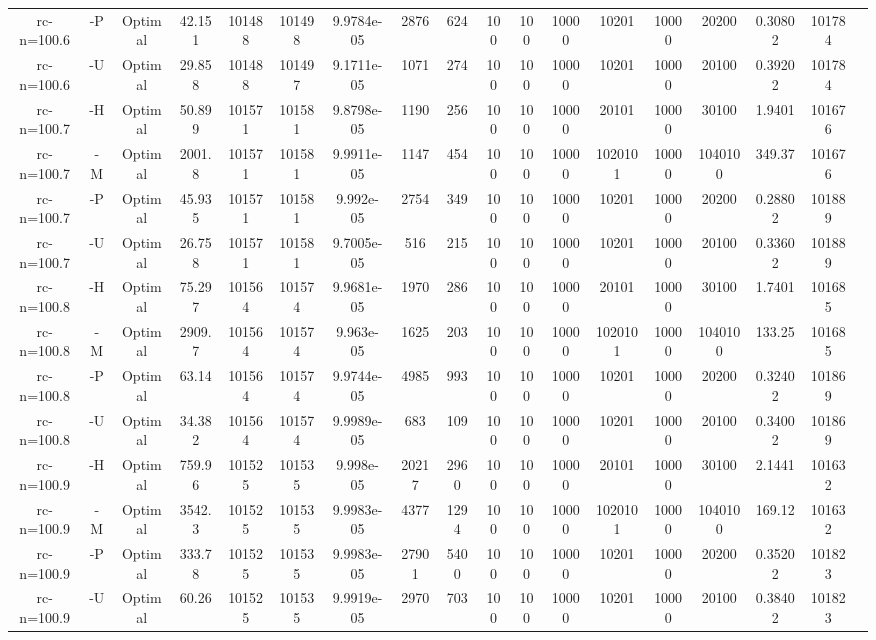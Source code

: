 \documentclass[landscape, a4paper]{article}
\begin{document}
\begin{center}
\begin{tabular}{@{}cccccccccccccccccc@{}}
rc-n=100.6 & -P & Optimal & 42.151 & 101488 & 101498 & 9.9784e-05 & 2876 & 624 & 100 & 100 & 10000 & 10201 & 10000 & 20200 & 0.30802 & 101784 & \\
rc-n=100.6 & -U & Optimal & 29.858 & 101488 & 101497 & 9.1711e-05 & 1071 & 274 & 100 & 100 & 10000 & 10201 & 10000 & 20100 & 0.39202 & 101784 & \\
rc-n=100.7 & -H & Optimal & 50.899 & 101571 & 101581 & 9.8798e-05 & 1190 & 256 & 100 & 100 & 10000 & 20101 & 10000 & 30100 & 1.9401 & 101676 & \\
rc-n=100.7 & -M & Optimal & 2001.8 & 101571 & 101581 & 9.9911e-05 & 1147 & 454 & 100 & 100 & 10000 & 1020101 & 10000 & 1040100 & 349.37 & 101676 & \\
rc-n=100.7 & -P & Optimal & 45.935 & 101571 & 101581 & 9.992e-05 & 2754 & 349 & 100 & 100 & 10000 & 10201 & 10000 & 20200 & 0.28802 & 101889 & \\
rc-n=100.7 & -U & Optimal & 26.758 & 101571 & 101581 & 9.7005e-05 & 516 & 215 & 100 & 100 & 10000 & 10201 & 10000 & 20100 & 0.33602 & 101889 & \\
rc-n=100.8 & -H & Optimal & 75.297 & 101564 & 101574 & 9.9681e-05 & 1970 & 286 & 100 & 100 & 10000 & 20101 & 10000 & 30100 & 1.7401 & 101685 & \\
rc-n=100.8 & -M & Optimal & 2909.7 & 101564 & 101574 & 9.963e-05 & 1625 & 203 & 100 & 100 & 10000 & 1020101 & 10000 & 1040100 & 133.25 & 101685 & \\
rc-n=100.8 & -P & Optimal & 63.14 & 101564 & 101574 & 9.9744e-05 & 4985 & 993 & 100 & 100 & 10000 & 10201 & 10000 & 20200 & 0.32402 & 101869 & \\
rc-n=100.8 & -U & Optimal & 34.382 & 101564 & 101574 & 9.9989e-05 & 683 & 109 & 100 & 100 & 10000 & 10201 & 10000 & 20100 & 0.34002 & 101869 & \\
rc-n=100.9 & -H & Optimal & 759.96 & 101525 & 101535 & 9.998e-05 & 20217 & 2960 & 100 & 100 & 10000 & 20101 & 10000 & 30100 & 2.1441 & 101632 & \\
rc-n=100.9 & -M & Optimal & 3542.3 & 101525 & 101535 & 9.9983e-05 & 4377 & 1294 & 100 & 100 & 10000 & 1020101 & 10000 & 1040100 & 169.12 & 101632 & \\
rc-n=100.9 & -P & Optimal & 333.78 & 101525 & 101535 & 9.9983e-05 & 27901 & 5400 & 100 & 100 & 10000 & 10201 & 10000 & 20200 & 0.35202 & 101823 & \\
rc-n=100.9 & -U & Optimal & 60.26 & 101525 & 101535 & 9.9919e-05 & 2970 & 703 & 100 & 100 & 10000 & 10201 & 10000 & 20100 & 0.38402 & 101823 & \\

\end{tabular}
\end{center}
\end{document}
